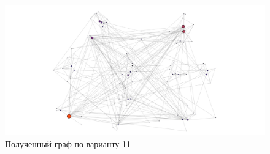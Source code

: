\begin{figure}[h!]
	\centering
	\includegraphics[width=1\textwidth]{img/graf} %
	\caption{Полученный граф по варианту 11}
	\label{img:graf}
\end{figure}